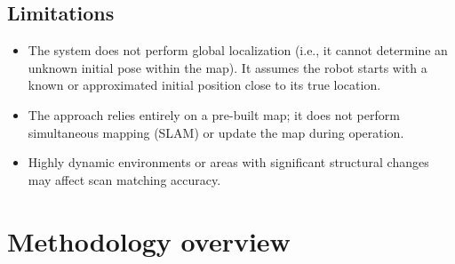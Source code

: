 \subsection{Limitations}
\begin{itemize}
    \item The system does not perform global localization (i.e., it cannot determine an unknown initial pose within the map). It assumes the robot starts with a known or approximated initial position close to its true location.
    \item The approach relies entirely on a pre-built map; it does not perform simultaneous mapping (SLAM) or update the map during operation.
    \item Highly dynamic environments or areas with significant structural changes may affect scan matching accuracy.
\end{itemize}


\section{Methodology overview}


